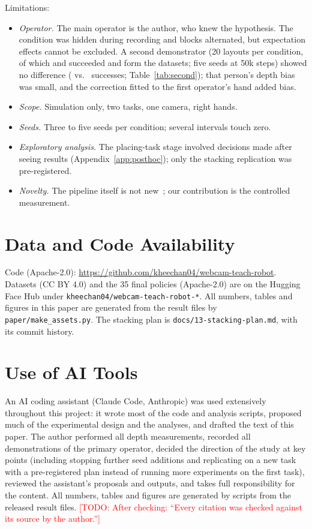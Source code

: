 \documentclass[10pt]{article}
\newcommand{\todo}[1]{\textcolor{red}{[TODO: #1]}}
\begin{document}
Limitations:
\begin{itemize}
\item \emph{Operator.} The main operator is the author, who knew the hypothesis. The condition was hidden during recording and blocks alternated, but expectation effects cannot be excluded. A second demonstrator (20 layouts per condition, of which \ptwoDemosTwo{} and \ptwoDemosThree{} succeeded and form the datasets; five seeds at 50k steps) showed no difference (\ptwoTwo{} vs.\ \ptwoThree{} successes; Table~\ref{tab:second}); that person's depth bias was small, and the correction fitted to the first operator's hand added bias.
\item \emph{Scope.} Simulation only, two tasks, one camera, right hands.
\item \emph{Seeds.} Three to five seeds per condition; several intervals touch zero.
\item \emph{Exploratory analysis.} The placing-task stage involved decisions made after seeing results (Appendix~\ref{app:posthoc}); only the stacking replication was pre-registered.
\item \emph{Novelty.} The pipeline itself is not new~\citep{handrobot}; our contribution is the controlled measurement.
\end{itemize}

\section*{Data and Code Availability}
Code (Apache-2.0): \url{https://github.com/kheechan04/webcam-teach-robot}.
Datasets (CC BY 4.0) and the 35 final policies (Apache-2.0) are on the Hugging Face Hub under \texttt{kheechan04/webcam-teach-robot-*}.
All numbers, tables and figures in this paper are generated from the result files by \texttt{paper/make\_assets.py}.
The stacking plan is \texttt{docs/13-stacking-plan.md}, with its commit history.

\section*{Use of AI Tools}
An AI coding assistant (Claude Code, Anthropic) was used extensively throughout this project: it wrote most of the code and analysis scripts, proposed much of the experimental design and the analyses, and drafted the text of this paper.
The author performed all depth measurements, recorded all demonstrations of the primary operator, decided the direction of the study at key points (including stopping further seed additions and replicating on a new task with a pre-registered plan instead of running more experiments on the first task), reviewed the assistant's proposals and outputs, and takes full responsibility for the content.
All numbers, tables and figures are generated by scripts from the released result files. \todo{After checking: ``Every citation was checked against its source by the author.''}
\end{document}
